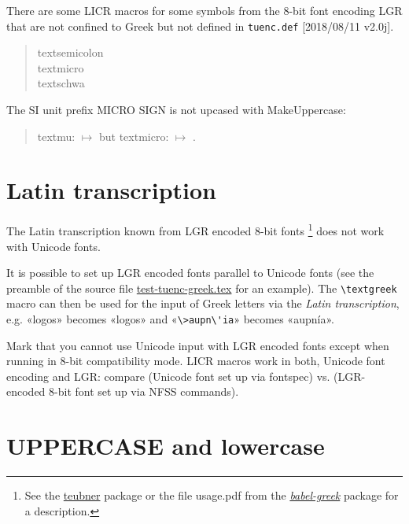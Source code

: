 \documentclass[a4paper]{article}
\begin{document}
There are some LICR macros for some symbols from the 8-bit font encoding LGR
that are not confined to Greek but not defined in
\texttt{tuenc.def} [2018/08/11 v2.0j].

\begin{quote}
  \textsemicolon{} textsemicolon\\
  \textmicro{} textmicro \\
  \textschwa{} textschwa
\end{quote}
The SI unit prefix MICRO SIGN is not upcased with MakeUppercase:

\begin{quote}
  textmu: \textmu{} $\mapsto$ \MakeUppercase{\textmu} but
  textmicro: \textmicro{} $\mapsto$ \MakeUppercase{\textmicro}.
\end{quote}


\section{Latin transcription}

The Latin transcription known from LGR encoded 8-bit fonts%
\footnote{ See the \href{http://www.ctan.org/pkg/teubner}{teubner} package
or the file usage.pdf from the
\href{http://www.ctan.org/pkg/babel-greek}{\emph{babel-greek}} package for a
description.}
does not work with Unicode fonts.

It is possible to set up LGR encoded fonts parallel to Unicode fonts (see
the preamble of the source file \url{test-tuenc-greek.tex} for an example).
The \verb|\textgreek| macro can then be used for the input of Greek letters
via the \emph{Latin transcription}, e.g. «logos» becomes «\textgreek{logos}»
and «\verb|\>aupn\'ia|» becomes «\textgreek{\>aupn\'ia}».

Mark that you cannot use Unicode input with LGR encoded fonts except when
running in 8-bit compatibility mode.
LICR macros work in both, Unicode font encoding and LGR: compare
           \>\textIota\textalpha\textnu\textomicron\textupsilon\textalpha
           \textrho\acctonos\textiota\textomicron\textupsilon{}
(Unicode font set up via fontspec) vs.
\textgreek{\>\textIota\textalpha\textnu\textomicron\textupsilon\textalpha
           \textrho\acctonos\textiota\textomicron\textupsilon}
(LGR-encoded 8-bit font set up via NFSS commands).


\section{UPPERCASE and lowercase}
\end{document}

